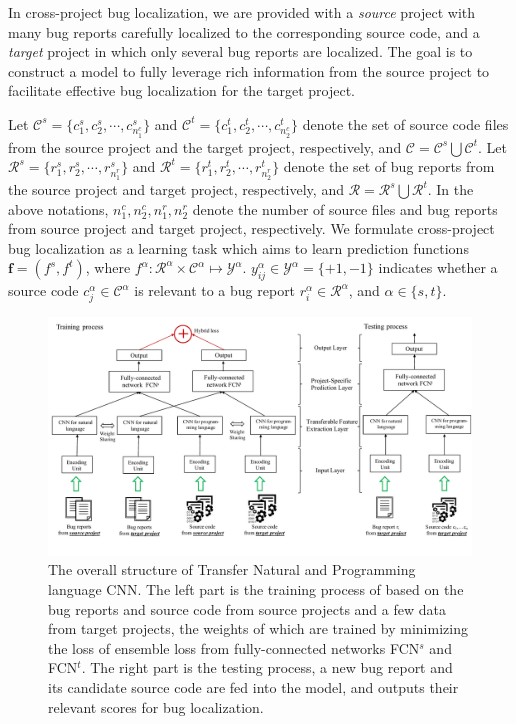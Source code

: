 In cross-project bug localization, we are provided with a \emph{source} project with many bug reports carefully localized to the corresponding source code, and a \emph{target} project in which only several bug reports are localized. The goal is to construct a model to fully leverage rich information from the source project to facilitate effective bug localization for the target project.

Let $\mathcal{C}^s = \{ { c^s_1, c^s_2}, \cdots, c^s_{n^c_1} \} $ and $\mathcal{C}^t =\{ c^t_1, c^t_2, \cdots, c^t_{n^c_2} \}$ denote the set of source code files from the source project and the target project, respectively, and $\mathcal{C}=\mathcal{C}^s \bigcup \mathcal{C}^t $. Let $\mathcal{R}^s =\{r^s_1, r^s_2, \cdots, r^s_{n^r_1}\}$ and $\mathcal{R}^t =\{ r^t_1, r^t_2, \cdots, r^t_{n^r_2}\}$ denote the set of bug reports from the source project and target project, respectively, and $\mathcal{R}=\mathcal{R}^s \bigcup \mathcal{R}^t $. In the above notations, $n^c_1, n^c_2, n^r_1, n^r_2$ denote the number of source files and bug reports from source project and target project, respectively. We formulate cross-project bug localization as a learning task which aims to learn prediction functions $\mathbf{f}=(f^s,f^t)$, where $f^\alpha: \mathcal{R}^\alpha \times \mathcal{C}^\alpha \mapsto \mathcal{Y}^\alpha$. $y^\alpha_{ij} \in \mathcal{Y}^\alpha = \{+1, -1\}$ indicates whether a source code $c^\alpha_j \in \mathcal{C}^\alpha $ is relevant to a bug report $r^\alpha_i \in \mathcal{R}^\alpha$, and $\alpha \in \{s,t\}$.   %


\begin{figure}[hbt]
\centering
\includegraphics[width = 2\columnwidth]{pic/structure.pdf}
\caption{The overall structure of Transfer Natural and Programming language CNN.  The left part is the training process of \TRANPCNN based on the bug reports and source code from source projects and a few data from target projects, the weights of which are trained by minimizing the loss of ensemble loss from fully-connected networks FCN$^s$ and FCN$^t$. The right part is the testing process, a new bug report and its candidate source code are fed into the model, and \TRANPCNN outputs their relevant scores for bug localization.}
\label{fig:structure}
\end{figure}

